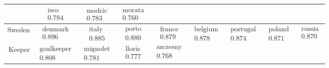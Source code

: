\documentclass[10pt, a4paper]{UUThesisTemplate}
\begin{document}
\begin{table}[hb]
\begin{tabular}{r|c c c c c c c c}
 & $\begin{matrix}\text{isco}\\0.784\end{matrix}$
 & $\begin{matrix}\text{modric}\\0.783\end{matrix}$
 & $\begin{matrix}\text{morata}\\0.760\end{matrix}$
 \\\hline
Sweden
 & $\begin{matrix}\text{denmark}\\0.896\end{matrix}$
 & $\begin{matrix}\text{italy}\\0.885\end{matrix}$
 & $\begin{matrix}\text{porto}\\0.880\end{matrix}$
 & $\begin{matrix}\text{france}\\0.879\end{matrix}$
 & $\begin{matrix}\text{belgium}\\0.878\end{matrix}$
 & $\begin{matrix}\text{portugal}\\0.874\end{matrix}$
 & $\begin{matrix}\text{poland}\\0.871\end{matrix}$
 & $\begin{matrix}\text{russia}\\0.870\end{matrix}$
 \\\hline
Keeper
 & $\begin{matrix}\text{goalkeeper}\\0.808\end{matrix}$
 & $\begin{matrix}\text{mignolet}\\0.781\end{matrix}$
 & $\begin{matrix}\text{lloris}\\0.777\end{matrix}$
 & $\begin{matrix}\text{szczesny}\\0.768\end{matrix}$

\end{tabular}
\end{table}
\end{document}
